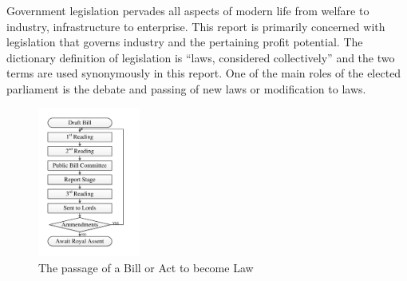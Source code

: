 {}

Government legislation pervades all aspects of modern life from welfare to industry, infrastructure to enterprise.
This report is primarily concerned with legislation that governs industry and the pertaining profit potential.
The dictionary definition of legislation is ``laws, considered collectively'' \cite{OED} and the two terms are used synonymously in this report.
One of the main roles of the elected parliament is the debate and passing of new laws or modification to laws.


\begin{figure}[!h]
\centering
\includegraphics[width = 0.3\textwidth]{Figures/BillFormulation.pdf}
\caption{The passage of a Bill or Act to become Law}
\label{figure:passage}
\end{figure}


